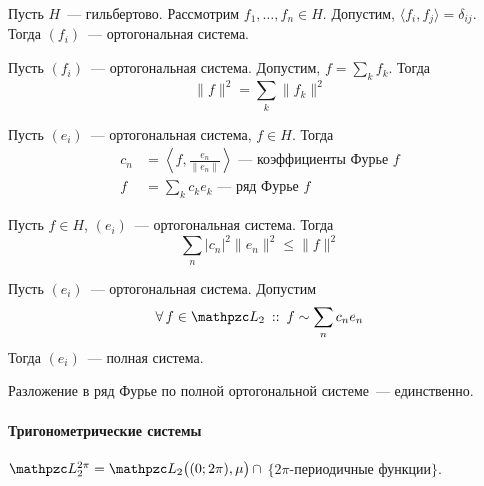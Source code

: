 \documentclass[12pt,draft,timbord]{longnotes}
\begin{document}
\begin{defn}\label{defn:fourier::orthseries}
  Пусть $H$~--- гильбертово. Рассмотрим $f_1, \dotsc, f_n \in H$. 
  Допустим, $\langle f_i,f_j \rangle = \delta_{ij}$. Тогда $(f_i)$~--- ортогональная
  система.
\end{defn}

\begin{thrm}\label{thrm:fourier::orthseries::pif}
  Пусть $(f_i)$~--- ортогональная система. Допустим, $f = \sum_k f_k$. Тогда
  \[
    \|f\| ^2 = \sum_k \|f_k\|^2
  \]
\end{thrm}

\begin{defn}\label{defn:fourier::orthseries::fs}
  Пусть $(e_i)$~--- ортогональная система, $f \in H$. Тогда
  \[
    \begin{split}
      c_n &= \left\langle f, \frac{e_n}{\|e_n\|} \right\rangle \text{~--- коэффициенты Фурье $f$} \\
      f &=\sum_k c_k e_k  \text{~--- ряд Фурье $f$}
    \end{split}
  \]
  
\end{defn}

\begin{thrm}\label{thrm:fourier::orthseries::ineq}
  Пусть $f\in H$,  $(e_i)$~--- ортогональная система. Тогда \[
    \sum_n |c_n|^2 \|e_n\|^2 \leqslant \|f\|^2
  \]
\end{thrm}

\begin{defn}\label{defn:fourier::orthseries::compl}
  Пусть $(e_i)$~--- ортогональная система. Допустим 
  \[
    \forall\, f \in \summb_2 \holds f \sim \sum_n c_n e_n 
  \]
  Тогда $(e_i)$~--- полная система.
\end{defn}
\begin{stat}\label{stat:fourier::orthseries::uniq}
  Разложение в ряд Фурье по полной ортогональной системе~--- единственно.
\end{stat}

\paragraph{Тригонометрические системы}
\label{par:fourier::trigseries}

\begin{defn}\label{defn:fourier::trigseries::space}
  $\summb_2^{2\pi} = \summb_2\bigl((0;2\pi),\mu\bigr) \, \cap $ $\{2\pi$-периодичные функции$\}$.
\end{defn}
\end{document}
